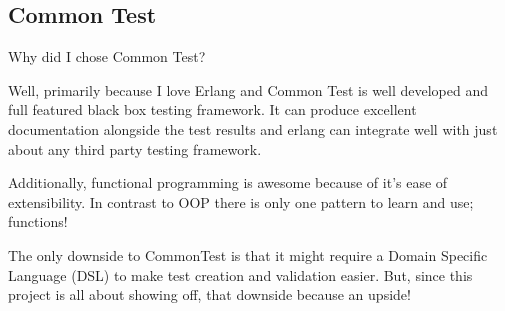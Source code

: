 \subsection{Common Test}\label{sec:commontest}

Why did I chose Common Test?

Well, primarily because I love Erlang and Common Test is well developed and 
full featured black box testing framework.  It can produce excellent documentation
alongside the test results and erlang can integrate well with just about any
third party testing framework.

Additionally, functional programming is awesome because of it's ease of 
extensibility.  In contrast to OOP there is only one pattern to learn and use;
functions! 

The only downside to CommonTest is that it might require a Domain Specific Language (DSL)
to make test creation and validation easier.  But, since this project is all about
showing off, that downside because an upside!